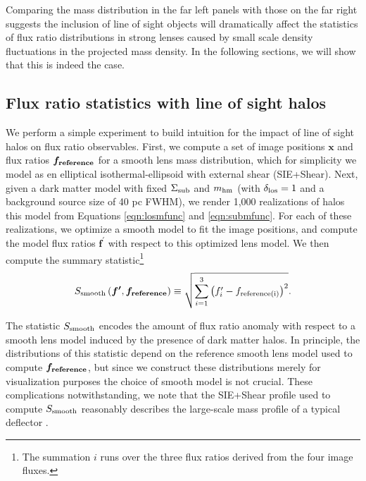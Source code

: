 Comparing the mass distribution in the far left panels with those on the far right suggests the inclusion of line of sight objects will dramatically affect the statistics of flux ratio distributions in strong lenses caused by small scale density fluctuations in the projected mass density. In the following sections, we will show that this is indeed the case.

\subsection{Flux ratio statistics with line of sight halos}
\label{ssec:lostats}
We perform a simple experiment to build intuition for the impact of line of sight halos on flux ratio observables. First, we compute a set of image positions $\boldsymbol{x}$ and flux ratios $\boldsymbol{f_{\rm{reference}}}$ for a smooth lens mass distribution, which for simplicity we model as en elliptical isothermal-ellipsoid with external shear (SIE+Shear). Next, given a dark matter model with fixed $\Sigma_{\rm{sub}}$ and ${m_{\rm{hm}}}$ (with $\delta_{\rm{los}} = 1$ and a background source size of 40 pc FWHM), we render 1,000 realizations of halos this model from Equations \ref{eqn:losmfunc} and \ref{eqn:submfunc}. For each of these realizations, we optimize a smooth model to fit the image positions, and compute the model flux ratios $\boldsymbol{f^{\prime}}$ with respect to this optimized lens model. We then compute the summary statistic\footnote{The summation $i$ runs over the three flux ratios derived from the four image fluxes.}
\begin{equation}
\label{eqn:summary_statsmooth}
S_{\rm{smooth}} \left(\boldsymbol{f^{\prime}},\boldsymbol{f_{\rm{reference}}} \right) \equiv \sqrt{\sum_{i=1}^{3} \left({f}^{\prime}_{i} - f_{\rm{reference(i)}} \right)^2}.
\end{equation}

The statistic $S_{\rm{smooth}}$ encodes the amount of flux ratio anomaly with respect to a smooth lens model induced by the presence of dark matter halos. In principle, the distributions of this statistic depend on the reference smooth lens model used to compute $\boldsymbol{f_{\rm{reference}}}$, but since we construct these distributions merely for visualization purposes the choice of smooth model is not crucial.  These complications notwithstanding, we note that the SIE+Shear profile used to compute $S_{\rm{smooth}}$ reasonably describes the large-scale mass profile of a typical deflector \cite{Auger++10,Gilman++17}. 

